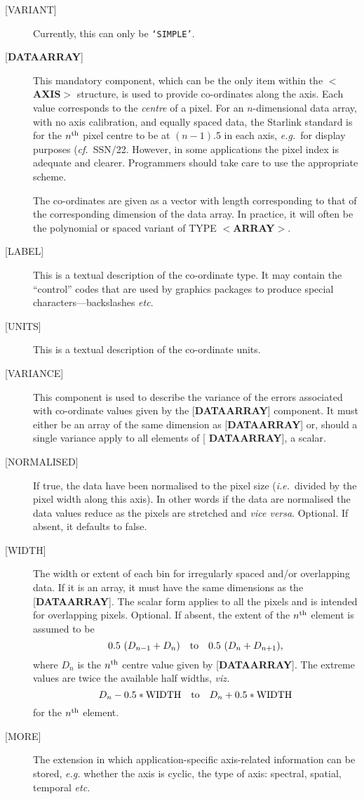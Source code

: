 \documentclass[twoside,11pt]{article}
\newcommand{\xref}[3]{#1}
\renewcommand{\_}{\texttt{\symbol{95}}}
\begin{document}
\begin{description}
\item [{[}VARIANT{]}]
Currently, this can only be {\tt `SIMPLE'}.
\item [{[}{\bf DATA\_ARRAY}{]}]
This mandatory component, which
can be the only item within the $<${\bf AXIS}$>$ structure,
is used to provide co-ordinates along the axis.
Each value corresponds to the {\it centre} of a pixel.  For an
$n$-dimensional data array, with no axis calibration, and equally spaced
data, the Starlink standard is for the $n^{\rm th}$ pixel centre to be at
$(n-1)$.5 in each axis, {\it e.g.}\  for display purposes
({\it cf.}\  \xref{SSN/22}{ssn22}). However, in some applications the pixel
index is adequate and clearer.  Programmers should take care to use
the appropriate scheme.

The co-ordinates are given as
a vector with length corresponding to that of the corresponding
dimension of the data array. In practice, it will often be
the polynomial or spaced variant of TYPE \mbox{$<${\bf ARRAY}$>$}.

\item [{[}LABEL{]}]
This is a textual description of the co-ordinate type.  It may
contain the ``control'' codes that are used by graphics packages
to produce special characters---backslashes {\it etc}.
\item [{[}UNITS{]}]
This is a textual description of the co-ordinate units.
\item [{[}VARIANCE{]}]
This component is used to describe the variance of the
errors associated with co-ordinate
values given by the {[}{\bf DATA\_ARRAY}{]} component.
It must either be an array of
the same dimension as {[}{\bf DATA\_ARRAY}{]} or,
should a single variance apply to all elements of {[}{\bf
DATA\_ARRAY}{]},
a scalar.
\item [{[}NORMALISED{]}]
If true, the data have been normalised to the pixel size
({\it i.e.}\ divided by the pixel width along this axis).
In other words if the data are
normalised the data values reduce as the pixels are stretched and {\it
vice versa}. Optional. If absent, it defaults to false.
\item [{[}WIDTH{]}]
The width or extent of each bin for irregularly spaced
and/or overlapping data.
If it is an array, it must have
the same dimensions as the {[}{\bf DATA\_ARRAY}{]}.
The scalar form applies to all the pixels and is intended for overlapping
pixels.  Optional.  If absent, the extent of the $n^{\rm th}$
element is assumed to be
\[ 0.5~(D_{n-1}+D_n)~~~{\rm to}~~~0.5~(D_n+D_{n+1}) , \]
where $D_n$ is the $n^{\rm th}$ centre
value given by {[}{\bf DATA\_ARRAY}{]}. The
extreme values are twice the available half widths, {\it viz.}
\[ D_n - 0.5 * {\rm WIDTH} ~~~ {\rm to} ~~~ D_n + 0.5 * {\rm WIDTH} \]
for the $n^{\rm th}$ element.
\item [{[}MORE{]}] The extension in which application-specific
axis-related information can be stored,
{\it e.g.} whether the axis is cyclic, the type of axis: spectral,
spatial, temporal {\it etc.}
\end{description}
\end{document}

